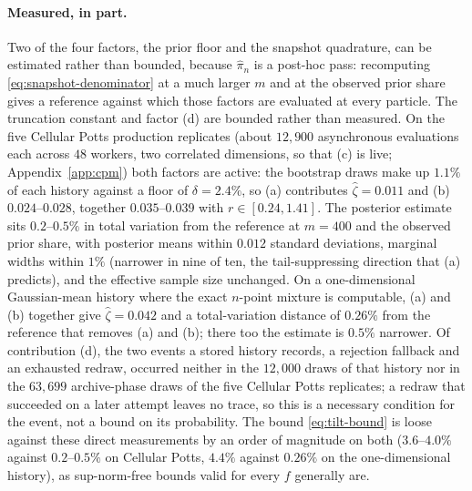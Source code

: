 \documentclass[pdflatex,sn-mathphys-num]{sn-jnl}
\theoremstyle{plain}
\theoremstyle{definition}
\begin{document}
\begin{appendices}
\paragraph{Measured, in part.} Two of the four factors, the prior floor and the snapshot quadrature, can be estimated rather than bounded, because $\widehat\pi_n$ is a post-hoc pass: recomputing \eqref{eq:snapshot-denominator} at a much larger $m$ and at the observed prior share gives a reference against which those factors are evaluated at every particle. The truncation constant and factor (d) are bounded rather than measured. On the five Cellular Potts production replicates (about $12{,}900$ asynchronous evaluations each across $48$ workers, two correlated dimensions, so that (c) is live; Appendix~\ref{app:cpm}) both factors are active: the bootstrap draws make up $1.1\%$ of each history against a floor of $\delta=2.4\%$, so (a) contributes $\widehat\zeta=0.011$ and (b) $0.024$--$0.028$, together $0.035$--$0.039$ with $r\in[0.24,1.41]$. The posterior estimate sits $0.2$--$0.5\%$ in total variation from the reference at $m=400$ and the observed prior share, with posterior means within $0.012$ standard deviations, marginal widths within $1\%$ (narrower in nine of ten, the tail-suppressing direction that (a) predicts), and the effective sample size unchanged. On a one-dimensional Gaussian-mean history where the exact $n$-point mixture is computable, (a) and (b) together give $\widehat\zeta=0.042$ and a total-variation distance of $0.26\%$ from the reference that removes (a) and (b); there too the estimate is $0.5\%$ narrower. Of contribution (d), the two events a stored history records, a rejection fallback and an exhausted redraw, occurred neither in the $12{,}000$ draws of that history nor in the $63{,}699$ archive-phase draws of the five Cellular Potts replicates; a redraw that succeeded on a later attempt leaves no trace, so this is a necessary condition for the event, not a bound on its probability. The bound \eqref{eq:tilt-bound} is loose against these direct measurements by an order of magnitude on both ($3.6$--$4.0\%$ against $0.2$--$0.5\%$ on Cellular Potts, $4.4\%$ against $0.26\%$ on the one-dimensional history), as sup-norm-free bounds valid for every $f$ generally are.


\end{appendices}
\end{document}

